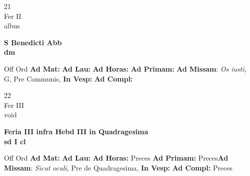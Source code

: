 \documentclass[10pt, openany]{book}
\begin{document}
    \begin{center}
        \begin{minipage}{3.5in}
            \vspace{2em}
            \begin{minipage}{0.5in}
                {\Huge 21} \\
                {\normalsize Fer II} \\
                {\normalsize albus}
            \end{minipage}
            \begin{minipage}{3.0in}
                \textbf{ \large S Benedicti Abb \\
                \textnormal{\normalsize dm}} \\ 
            \end{minipage}
            \begin{justify}Off Ord
                \textbf{Ad Mat: }
                \textbf{Ad Lau: }
                \textbf{Ad Horas: }
                \textbf{Ad Primam: }\textbf{Ad Missam}: \textit{Os iusti,} G, Pre Communis,  
                \textbf{In Vesp: }
                \textbf{Ad Compl: }
            \end{justify}
        \end{minipage}
    \end{center}

    \begin{center}
        \begin{minipage}{3.5in}
            \vspace{2em}
            \begin{minipage}{0.5in}
                {\Huge 22} \\
                {\normalsize Fer III} \\
                {\normalsize void}
            \end{minipage}
            \begin{minipage}{3.0in}
                \textbf{ \large Feria III infra Hebd III in Quadragesima \\
                \textnormal{\normalsize sd I cl}} \\ 
            \end{minipage}
            \begin{justify}Off Ord
                \textbf{Ad Mat: }
                \textbf{Ad Lau: }
                \textbf{Ad Horas: }Preces
                \textbf{Ad Primam: }Preces\textbf{Ad Missam}: \textit{Sicut oculi,} Pre de Quadragesima,  
                \textbf{In Vesp: }
                \textbf{Ad Compl: }Preces
            \end{justify}
        \end{minipage}
    \end{center}
\end{document}
